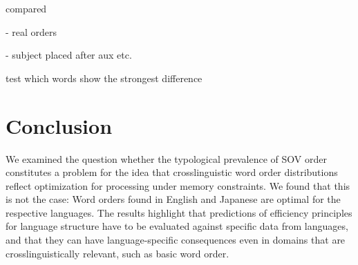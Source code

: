 \documentclass[11pt,a4paper]{article}
\begin{document}
compared

- real orders

- subject placed after aux etc.


test which words show the strongest difference


\section{Conclusion}
We examined the question whether the typological prevalence of SOV order constitutes a problem for the idea that crosslinguistic word order distributions reflect optimization for processing under memory constraints.
We found that this is not the case: Word orders found in English and Japanese are optimal for the respective languages.
The results highlight that predictions of efficiency principles for language structure have to be evaluated against specific data from languages, and that they can have language-specific consequences even in domains that are crosslinguistically relevant, such as basic word order.



%
\end{document}

